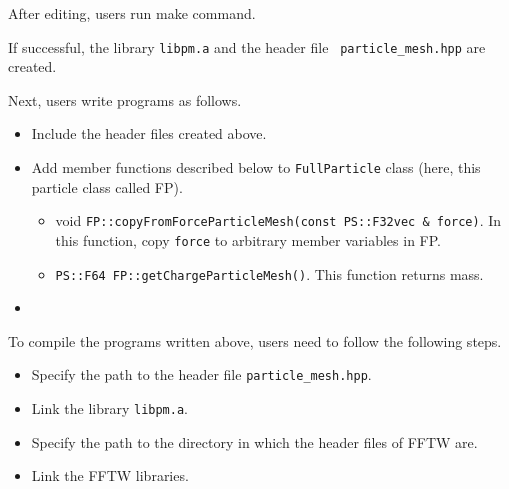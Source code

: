 After editing, users run make command.

If successful, the library {\tt libpm.a} and the header file {\tt
particle\_mesh.hpp} are created.


Next, users write programs as follows.

\begin{itemize}
\item Include the header files created above.
\item Add member functions described below to {\tt FullParticle} class (here, this particle class called FP).
  \begin{itemize}
  \item void {\tt FP::copyFromForceParticleMesh(const PS::F32vec \& force)}.
     In this function, copy {\tt force} to arbitrary member variables in FP.
  \item {\tt PS::F64 FP::getChargeParticleMesh()}. This function returns mass.
  \end{itemize}
\item 

\end{itemize}


To compile the programs written above, users need to follow the
following steps.

\begin{itemize}
\item Specify the path to the header file {\tt particle\_mesh.hpp}.
\item Link the library {\tt libpm.a}.
\item Specify the path to the directory in which the header files of FFTW are.
\item Link the FFTW libraries.
\end{itemize}

